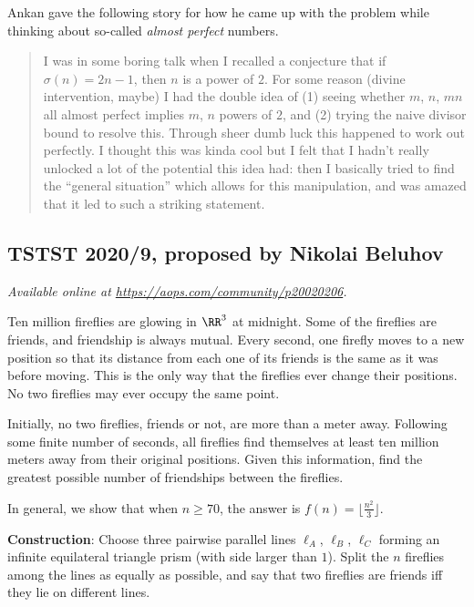 \documentclass[11pt]{scrartcl}
\begin{document}
\begin{remark*}
  Ankan gave the following story for how he came up with the problem
  while thinking about so-called \emph{almost perfect} numbers.
  \begin{quote}
  I was in some boring talk when I recalled a conjecture
  that if $\sigma(n) = 2n-1$, then $n$ is a power of $2$.
  For some reason (divine intervention, maybe) I had the double idea of
  (1) seeing whether $m$, $n$, $mn$ all almost perfect
  implies $m$, $n$ powers of $2$,
  and (2) trying the naive divisor bound to resolve this.
  Through sheer dumb luck this happened to work out perfectly.
  I thought this was kinda cool but I felt that I hadn't really
  unlocked a lot of the potential this idea had:
  then I basically tried to find the ``general situation''
  which allows for this manipulation,
  and was amazed that it led to such a striking statement.
  \end{quote}
\end{remark*}
\pagebreak

\subsection{TSTST 2020/9, proposed by Nikolai Beluhov}
\textsl{Available online at \url{https://aops.com/community/p20020206}.}
\begin{mdframed}[style=mdpurplebox,frametitle={Problem statement}]
Ten million fireflies are glowing in $\RR^3$ at midnight.
Some of the fireflies are friends, and friendship is always mutual.
Every second, one firefly moves to a new position
so that its distance from each one of its friends is the same
as it was before moving.
This is the only way that the fireflies ever change their positions.
No two fireflies may ever occupy the same point.

Initially, no two fireflies, friends or not, are more than a meter away.
Following some finite number of seconds,
all fireflies find themselves at least ten million meters
away from their original positions.
Given this information,
find the greatest possible number of friendships between the fireflies.
\end{mdframed}
In general, we show that when $n \ge 70$,
the answer is $f(n) = \lfloor\tfrac{n^2}3\rfloor$.

\bigskip

\textbf{Construction}:
Choose three pairwise parallel lines $\ell_A$, $\ell_B$, $\ell_C$
forming an infinite equilateral triangle prism (with side larger than $1$).
Split the $n$ fireflies among the lines
as equally as possible,
and say that two fireflies are friends iff they lie on different lines.
\end{document}
